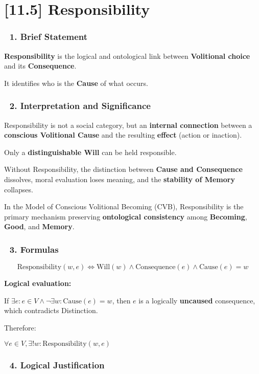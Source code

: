 \documentclass[12pt]{article}
\begin{document}
\section*{[11.5] Responsibility}

\subsubsection*{🔹 1. Brief Statement}

\textbf{Responsibility} is the logical and ontological link between \textbf{Volitional choice} and its \textbf{Consequence}.

It identifies who is the \textbf{Cause} of what occurs.

\subsubsection*{🔹 2. Interpretation and Significance}

Responsibility is not a social category, but an \textbf{internal connection} between a \textbf{conscious Volitional Cause} and the resulting \textbf{effect} (action or inaction).

Only a \textbf{distinguishable Will} can be held responsible.

Without Responsibility, the distinction between \textbf{Cause and Consequence} dissolves, moral evaluation loses meaning, and the \textbf{stability of Memory} collapses.

In the Model of Conscious Volitional Becoming (CVB), Responsibility is the primary mechanism preserving \textbf{ontological consistency} among \textbf{Becoming}, \textbf{Good}, and \textbf{Memory}.

\subsubsection*{🔹 3. Formulas}

\[
\text{Responsibility}(w, e) \iff \text{Will}(w) \land \text{Consequence}(e) \land \text{Cause}(e) = w
\]

\textbf{Logical evaluation:}

If $\exists e : e \in V \land \neg\exists w : \text{Cause}(e) = w$, then $e$ is a logically \textbf{uncaused} consequence, which contradicts \text{[9.1]} Distinction.

Therefore:

$\forall e \in V, \exists! w : \text{Responsibility}(w, e)$

\subsubsection*{🔹 4. Logical Justification}
\end{document}
